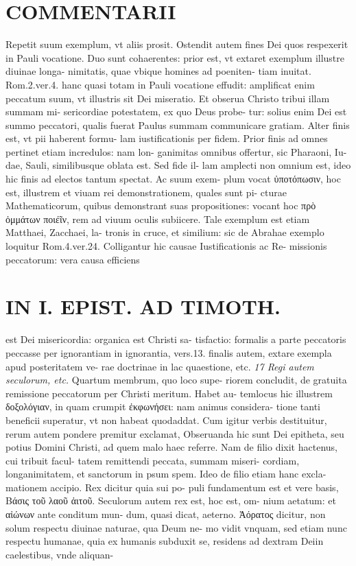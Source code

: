 \documentclass{article}
\begin{document}
\begin{pages}
\section*{COMMENTARII }
\marginpar{[ p.36 ]}\pstart Repetit suum exemplum, vt aliis prosit. Ostendit autem fines Dei quos respexerit in Pauli vocatione. Duo sunt cohaerentes: prior est, vt extaret exemplum illustre diuinae longa- nimitatis, quae vbique homines ad poeniten- tiam inuitat. Rom.2.ver.4. hanc quasi totam in Pauli vocatione effudit: amplificat enim peccatum suum, vt illustris sit Dei miseratio. Et obserua Christo tribui illam summam mi- sericordiae potestatem, ex quo Deus probe- tur: solius enim Dei est summo peccatori, qualis fuerat Paulus summam communicare gratiam. Alter finis est, vt pii haberent formu- lam iustificationis per fidem. Prior finis ad omnes pertinet etiam incredulos: nam lon- ganimitas omnibus offertur, sic Pharaoni, Iu- dae, Sauli, similibusque oblata est. Sed fide il- lam amplecti non omnium est, ideo hic finis ad electos tantum spectat. Ac suum exem- plum vocat ὐποτόπωσιν, hoc est, illustrem et viuam rei demonstrationem, quales sunt pi- cturae Mathematicorum, quibus demonstrant suas propositiones: vocant hoc πρὸ ὀμμάτων ποιέῖν, rem ad viuum oculis subiicere. Tale exemplum est etiam Matthaei, Zacchaei, la- tronis in cruce, et similium: sic de Abrahae exemplo loquitur Rom.4.ver.24. Colligantur hic causae Iustificationis ac Re-  \pend\pstart missionis peccatorum: vera causa efficiens  \pend
\section*{IN I. EPIST. AD TIMOTH. }
\marginpar{[ p.37 ]}\pstart est Dei misericordia: organica est Christi sa- tisfactio: formalis a parte peccatoris peccasse per ignorantiam in ignorantia, vers.13. finalis autem, extare exempla apud posteritatem ve- rae doctrinae in lac quaestione, etc.  \pend
\textit{17 Regi autem seculorum, etc. }\pstart Quartum membrum, quo loco supe- riorem concludit, de gratuita remissione peccatorum per Christi meritum. Habet au- temlocus hic illustrem δοξολόγιαν, in quam crumpit ἐκφωνήσει: nam animus considera- tione tanti beneficii superatur, vt non habeat quodaddat. Cum igitur verbis destituitur, rerum autem pondere premitur exclamat, Obseruanda hic sunt Dei epitheta, seu potius Domini Christi, ad quem malo haec referre. Nam de filio dixit hactenus, cui tribuit facul- tatem remittendi peccata, summam miseri- cordiam, longanimitatem, et sanctorum in psum spem. Ideo de filio etiam hanc excla- mationem accipio. Rex dicitur quia sui po- puli fundamentum est et vere basis, Βάσις τοῦ λαοῦ ἀιτοῦ. Seculorum autem rex est, hoc est, om- nium aetatum: et αἰώνων ante conditum mun- dum, quasi dicat, aeterno. Ἀόρατος dicitur, non solum respectu diuinae naturae, qua Deum ne- mo vidit vnquam, sed etiam nunc respectu humanae, quia ex humanis subduxit se, residens ad dextram Deiin caelestibus, vnde aliquan-  \pend

\end{pages}
\end{document}
